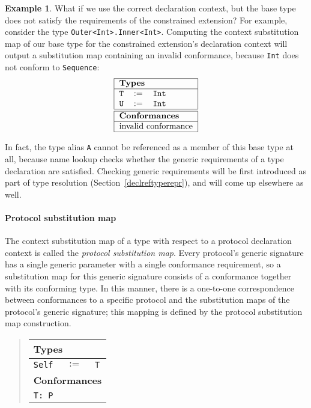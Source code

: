 \documentclass[a4paper,headsepline,bibliography=totoc,toc=flat,fleqn,twoside=semi]{scrbook}
\theoremstyle{definition}
\theoremstyle{definition}
\newtheorem{example}{Example}[chapter]
\theoremstyle{definition}
\newcommand{\SubMapC}[2]{\begin{tabular}{|lll|}
\hline
\multicolumn{3}{|l|}{\textbf{Types}}\\
\hline
#1\\
\hline
\hline
\multicolumn{3}{|l|}{\textbf{Conformances}}\\
\hline
#2\\
\hline
\end{tabular}}
\newcommand{\SubType}[2]{\texttt{#1}&$:=$&\texttt{#2}}
\newcommand{\SubConf}[1]{\multicolumn{3}{|l|}{\texttt{#1}}}
\begin{document}
\begin{example} What if we use the correct declaration context, but the base type does not satisfy the requirements of the constrained extension? For example, consider the type \texttt{Outer<Int>.Inner<Int>}. Computing the context substitution map of our base type for the constrained extension's declaration context will output a substitution map containing an invalid conformance, because \texttt{Int} does not conform to \texttt{Sequence}:
\[
\SubMapC{
\SubType{T}{Int}\\
\SubType{U}{Int}
}{
\multicolumn{3}{|l|}{invalid conformance}
}
\]
\end{example}
In fact, the type alias \texttt{A} cannot be referenced as a member of this base type at all, because name lookup checks whether the generic requirements of a type declaration are satisfied. Checking generic requirements will be first introduced as part of type resolution (Section~\ref{declreftyperepr}), and will come up elsewhere as well.
\paragraph{Protocol substitution map}
The context substitution map of a type with respect to a protocol declaration context is called the \emph{protocol substitution map}. Every protocol's generic signature has a single generic parameter with a single conformance requirement, so a substitution map for this generic signature consists of a conformance together with its conforming type. In this manner, there is a one-to-one correspondence between conformances to a specific protocol and the substitution maps of the protocol's generic signature; this mapping is defined by the protocol substitution map construction.
\begin{quote}
\SubMapC{
\SubType{Self}{T}
}{
\SubConf{T:~P}
}
\end{quote}
\end{document}
